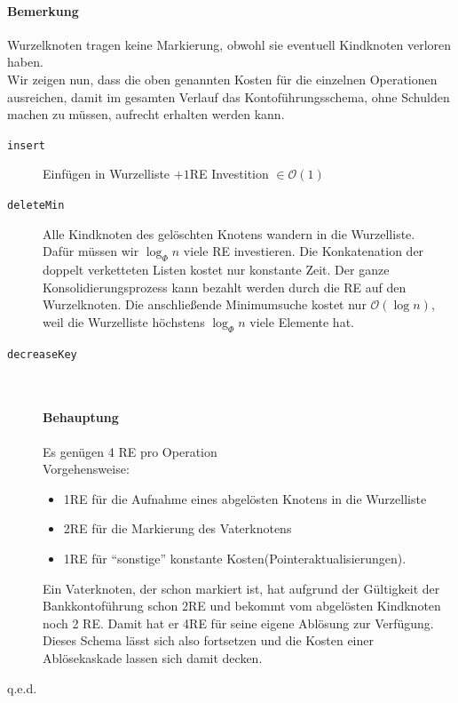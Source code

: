 \paragraph{Bemerkung}
Wurzelknoten tragen keine Markierung, obwohl sie eventuell Kindknoten verloren haben.\\

Wir zeigen nun, dass die oben genannten Kosten für die einzelnen Operationen ausreichen, damit im gesamten Verlauf das Kontoführungsschema, ohne Schulden machen zu müssen, aufrecht erhalten werden kann.\\
\begin{description}
	\item[\texttt{insert}] Einfügen in Wurzelliste $+1$RE Investition $\in\mathcal{O}(1)$\\
	\item[\texttt{deleteMin}] Alle Kindknoten des gelöschten Knotens wandern in die Wurzelliste.\\ Dafür müssen wir $\log_\Phi n$ viele RE investieren. Die Konkatenation der doppelt verketteten Listen kostet nur konstante Zeit. Der ganze Konsolidierungsprozess kann bezahlt werden durch die RE auf den Wurzelknoten. Die anschließende Minimumsuche kostet nur $\mathcal{O}(\log n)$, weil die Wurzelliste höchstens $\log_\Phi n$ viele Elemente hat.
	\item[\texttt{decreaseKey}] $ $
	\paragraph{Behauptung} Es genügen 4 RE pro Operation\\
	Vorgehensweise:
	\begin{itemize}
		\item 1RE für die Aufnahme eines abgelösten Knotens in die Wurzelliste
		\item 2RE für die Markierung des Vaterknotens
		\item 1RE für "`sonstige"' konstante Kosten(Pointeraktualisierungen).
	\end{itemize}
	Ein Vaterknoten, der schon markiert ist, hat aufgrund der Gültigkeit der Bankkontoführung schon 2RE und bekommt vom abgelösten Kindknoten noch 2 RE. Damit hat er 4RE für seine eigene Ablösung zur Verfügung. Dieses Schema lässt sich also fortsetzen und die Kosten einer Ablösekaskade lassen sich damit decken. %
\end{description}
\begin{flushright}
	q.e.d.
\end{flushright}